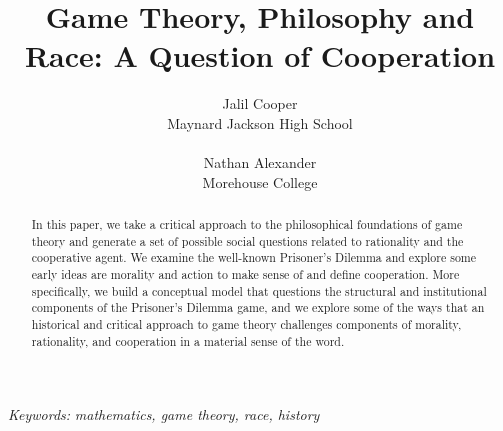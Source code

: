 \documentclass[12pt,twoside]{article}
\date{}
\title{\normalsize \headingfont \textbf{Game Theory, Philosophy and Race: A Question of Cooperation}}
\author{\normalsize Jalil Cooper \\ \normalsize Maynard Jackson High School
\\ \\ \normalsize Nathan Alexander \\ \normalsize Morehouse College %
}
\providecommand{\keywords}[1]
{
   \small	
  \textit{\hspace{-1em} Keywords: } #1
}
\begin{document}
\maketitle
\thispagestyle{firstpage}
\vspace{-5em}
\begin{abstract}
  \noindent 
In this paper, we take a critical approach to the philosophical foundations of game theory and generate a set of possible social questions related to rationality and the cooperative agent. We examine the well-known Prisoner's Dilemma and explore some early ideas are morality and action to make sense of and define cooperation. More specifically, we build a conceptual model that questions the structural and institutional components of the  Prisoner's Dilemma game, and we explore some of the ways that an historical and critical approach to game theory challenges components of morality, rationality, and cooperation in a material sense of the word.
\end{abstract}

\keywords{\textit{mathematics, game theory, race, history} \vspace{8ex}}

\newpage
%
\end{document}
